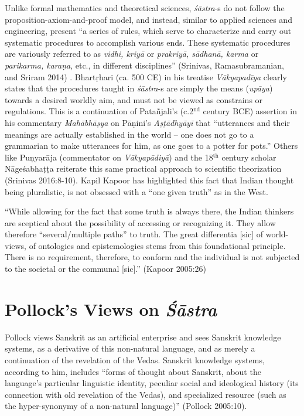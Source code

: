 Unlike formal mathematics and theoretical sciences, {\sl śāstra}-s do not follow the proposition-axiom-and-proof model, and instead, similar to applied sciences and engineering, present ``a series of rules, which serve to characterize and carry out systematic procedures to accomplish various ends. These systematic procedures are variously referred to as {\sl vidhi, kriyā} or {\sl prakriyā, sādhanā, karma} or {\sl parikarma, karaṇa}, etc., in different disciplines'' (Srinivas, Ramasubramanian, and Sriram 2014) . Bhartṛhari (ca. 500 CE) in his treatise {\sl Vākyapadīya} clearly states that the procedures taught in {\sl śāstra}-s are simply the means ({\sl upāya}) towards a desired worldly aim, and must not be viewed as constrains or regulations. This is a continuation of Patañjali's (c.2$^{\text{nd}}$ century BCE) assertion in his commentary {\sl Mahābhāṣya} on Pāṇini’s {\sl Aṣṭādhyāyī} that ``utterances and their meanings are actually established in the world -- one does not go to a grammarian to make utterances for him, as one goes to a potter for pots.'' Others like Puṇyarāja (commentator on {\sl Vākyapādiyā}) and the 18$^{\text{th}}$ century scholar Nāgeśabhaṭṭa reiterate this same practical approach to scientific theorization (Srinivas 2016:8-10). Kapil Kapoor has highlighted this fact that Indian thought being pluralistic, is not obsessed with a ``one given truth'' as in the West. 
\begin{myquote}
``While allowing for the fact that some truth is always there, the Indian thinkers are sceptical about the possibility of accessing or recognizing it. They allow therefore ``several/multiple paths'' to truth. The great differentia [sic] of world-views, of ontologies and epistemologies stems from this foundational principle. There is no requirement, therefore, to conform and the individual is not subjected to the societal or the communal [sic].'' (Kapoor 2005:26)
\end{myquote}

\section*{Pollock’s Views on {\sl\bfseries Śāstra}}

Pollock views Sanskrit as an artificial enterprise and sees Sanskrit knowledge systems, as a derivative of this non-natural language, and as merely a continuation of the revelation of the Vedas. Sanskrit knowledge systems, according to him, includes ``forms of thought about Sanskrit, about the language's particular linguistic identity, peculiar social and ideological history (its connection with old revelation of the Vedas), and specialized resource (such as the hyper-synonymy of a non-natural language)'' (Pollock 2005:10). 

